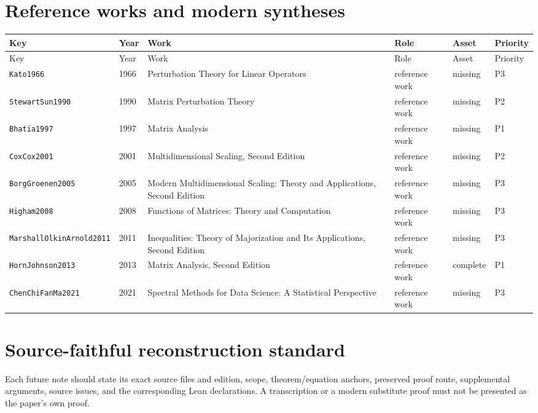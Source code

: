 \documentclass[10pt]{article}
\newcommand{\code}[1]{\texttt{#1}}
\begin{document}
\section*{Reference works and modern syntheses}
\begin{longtable}{@{}p{}p{}p{}p{}p{}p{}@{}}
\toprule
Key & Year & Work & Role & Asset & Priority \\
\midrule
\endfirsthead
\toprule
Key & Year & Work & Role & Asset & Priority \\
\midrule
\endhead
\code{Kato1966} & 1966 & Perturbation Theory for Linear Operators & reference work & missing & P3 \\
\code{StewartSun1990} & 1990 & Matrix Perturbation Theory & reference work & missing & P2 \\
\code{Bhatia1997} & 1997 & Matrix Analysis & reference work & missing & P1 \\
\code{CoxCox2001} & 2001 & Multidimensional Scaling, Second Edition & reference work & missing & P2 \\
\code{BorgGroenen2005} & 2005 & Modern Multidimensional Scaling: Theory and Applications, Second Edition & reference work & missing & P3 \\
\code{Higham2008} & 2008 & Functions of Matrices: Theory and Computation & reference work & missing & P3 \\
\code{MarshallOlkinArnold2011} & 2011 & Inequalities: Theory of Majorization and Its Applications, Second Edition & reference work & missing & P3 \\
\code{HornJohnson2013} & 2013 & Matrix Analysis, Second Edition & reference work & complete & P1 \\
\code{ChenChiFanMa2021} & 2021 & Spectral Methods for Data Science: A Statistical Perspective & reference work & missing & P3 \\
\bottomrule
\end{longtable}
\section*{Source-faithful reconstruction standard}
Each future note should state its exact source files and edition, scope, theorem/equation anchors, preserved proof route, supplemental arguments, source issues, and the corresponding Lean declarations. A transcription or a modern substitute proof must not be presented as the paper's own proof.
\end{document}
